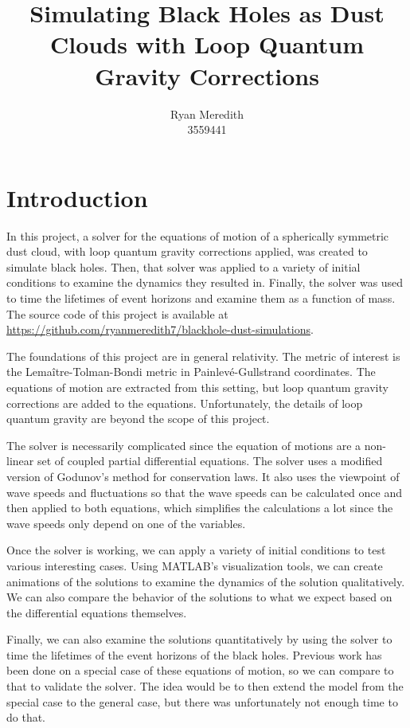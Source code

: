 \documentclass[12pt]{article}
\title{Simulating Black Holes as Dust Clouds with Loop Quantum Gravity Corrections}
\author{Ryan Meredith\\3559441}
\begin{document}
\maketitle

\tableofcontents

\section{Introduction}

In this project, a solver for the equations of motion of a spherically symmetric dust
cloud, with loop quantum gravity corrections applied, was created to simulate black
holes. Then, that solver was applied to a variety of initial conditions to examine the
dynamics they resulted in. Finally, the solver was used to time the lifetimes of event
horizons and examine them as a function of mass. The source code of this project is
available at \url{https://github.com/ryanmeredith7/blackhole-dust-simulations}.

The foundations of this project are in general relativity. The metric of interest is the
Lema\^{i}tre-Tolman-Bondi metric in Painlev\'{e}-Gullstrand coordinates. The equations of
motion are extracted from this setting, but loop quantum gravity corrections are added
to the equations. Unfortunately, the details of loop quantum gravity are beyond the
scope of this project.

The solver is necessarily complicated since the equation of motions are a non-linear set
of coupled partial differential equations. The solver uses a modified version of
Godunov's method for conservation laws. It also uses the viewpoint of wave speeds and
fluctuations so that the wave speeds can be calculated once and then applied to both
equations, which simplifies the calculations a lot since the wave speeds only depend on
one of the variables.

Once the solver is working, we can apply a variety of initial conditions to test various
interesting cases. Using MATLAB's visualization tools, we can create animations of the
solutions to examine the dynamics of the solution qualitatively. We can also compare the
behavior of the solutions to what we expect based on the differential equations
themselves.

Finally, we can also examine the solutions quantitatively by using the solver to time
the lifetimes of the event horizons of the black holes. Previous work has been done on a
special case of these equations of motion, so we can compare to that to validate the
solver. The idea would be to then extend the model from the special case to the general
case, but there was unfortunately not enough time to do that.
\end{document}
